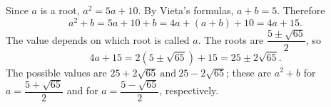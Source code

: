 Since $a$ is a root, $a^2=5a+10$. By Vieta's formulas, $a+b=5$. Therefore
\[a^2+b=5a+10+b=4a+(a+b)+10=4a+15 .\]
The value depends on which root is called $a$. The roots are $\dfrac{5\pm\sqrt{65}}{2}$, so
\[4a+15=2\left(5\pm\sqrt{65}\right)+15=25\pm2\sqrt{65}.\]
The possible values are $\boxed{25+2\sqrt{65}\ \text{and}\ 25-2\sqrt{65}}$; these are $a^2+b$ for $a=\dfrac{5+\sqrt{65}}{2}$ and for $a=\dfrac{5-\sqrt{65}}{2}$, respectively.
